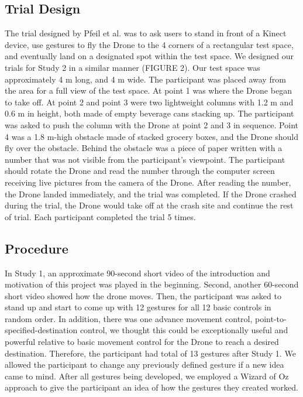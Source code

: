 \documentclass{sigchi}
\begin{document}
\subsection{Trial Design}

The trial designed by Pfeil et al. \cite{Pfeil:2013:EGM:2449396.2449429} was to ask users to stand in front of a Kinect device, use gestures to fly the Drone to the 4 corners of a rectangular test space, and eventually land on a designated spot within the test space. We designed our trials for Study 2 in a similar manner (FIGURE 2). Our test space was approximately 4 m long, and 4 m wide. The participant was placed away from the area for a full view of the test space. At point 1 was where the Drone began to take off. At point 2 and point 3 were two lightweight columns with 1.2 m and 0.6 m in height, both made of empty beverage cans stacking up. The participant was asked to push the column with the Drone at point 2 and 3 in sequence. Point 4 was a 1.8 m-high obstacle made of stacked grocery boxes, and the Drone should fly over the obstacle. Behind the obstacle was a piece of paper written with a number that was not visible from the participant's viewpoint. The participant should rotate the Drone and read the number through the computer screen receiving live pictures from the camera of the Drone. After reading the number, the Drone landed immediately, and the trial was completed. If the Drone crashed during the trial, the Drone would take off at the crash site and continue the rest of trial. Each participant completed the trial 5 times.



\subsection{Procedure}

In Study 1, an approximate 90-second short video of the introduction and motivation of this project was played in the beginning. Second, another 60-second short video showed how the drone moves. Then, the participant was asked to stand up and start to come up with 12 gestures for all 12 basic controls in random order. In addition, there was one advance movement control, point-to-specified-destination control, we thought this could be exceptionally useful and powerful relative to basic movement control for the Drone to reach a desired destination. Therefore, the participant had total of 13 gestures after Study 1. We allowed the participant to change any previously defined gesture if a new idea came to mind. After all gestures being developed, we employed a Wizard of Oz approach to give the participant an idea of how the gestures they created worked.
\end{document}
